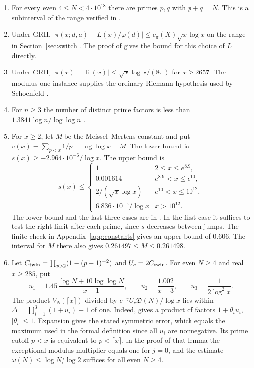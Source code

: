 \documentclass[11pt]{article}
\theoremstyle{remark}\newtheorem{remark}[theorem]{Remark}
\begin{document}
\begin{enumerate}[label=\textnormal{(\roman*)},leftmargin=*,itemsep=4pt]
\item For every even $4\le N<4\cdot10^{18}$ there are primes $p,q$ with $p+q=N$. This is a subinterval of the range verified in \cite{OHP}.
\item Under GRH, $|\pi(x;d,a)-L(x)/\varphi(d)|\le c_\pi(X)\sqrt x\log x$ on the range in Section~\ref{sec:switch}. The proof of \cite[Lemma~5.1]{JS} gives the bound for this choice of $L$ directly.
\item Under GRH, $|\pi(x)-\operatorname{li}(x)|\le\sqrt{x}\log x/(8\pi)$ for $x\ge2657$. The modulus-one instance supplies the ordinary Riemann hypothesis used by Schoenfeld \cite[Corollary~1]{Schoenfeld}.
\item For $n\ge3$ the number of distinct prime factors is less than $1.3841\log n/\log\log n$ \cite[Théorème 11]{Robin}.
\item For $x\ge2$, let $M$ be the Meissel--Mertens constant and put $s(x)=\sum_{p<x}1/p-\log\log x-M$. The lower bound is $s(x)\ge-2.964\cdot10^{-6}/\log x$. The upper bound is
\[
 s(x)\le\begin{cases}
 1 & 2\le x\le e^{8.9},\\
 0.001614 & e^{8.9}<x\le e^{10},\\
 2/(\sqrt x\log x) & e^{10}<x\le10^{12},\\
 6.836\cdot10^{-6}/\log x & x>10^{12}.
 \end{cases}
\]
The lower bound and the last three cases are in \cite[Lemma~3.2 and its proof]{JS}. In the first case it suffices to test the right limit after each prime, since $s$ decreases between jumps. The finite check in Appendix~\ref{app:constants} gives an upper bound of $0.606$. The interval for $M$ there also gives $0.261497\le M\le0.261498$.
\item Let $C_{\rm twin}=\prod_{p>2}(1-(p-1)^{-2})$ and $U_c=2C_{\rm twin}$. For even $N\ge4$ and real $x\ge285$, put
\[
 u_1=1.45\,\frac{\log N+10\log\log N}{x-1},\qquad
 u_2=\frac{1.002}{x-3},\qquad u_3=\frac1{2\log^2 x}.
\]
The product $V_N(\lceil x\rceil)$ divided by $e^{-\gamma}U_c\mathfrak D(N)/\log x$ lies within
$\Delta=\prod_{i=1}^3(1+u_i)-1$ of one. Indeed, \cite[Lemma~38, $j=0$]{BJS} gives a product of factors $1+\theta_i u_i$, $|\theta_i|\le1$. Expansion gives the stated symmetric error, which equals the maximum used in the formal definition since all $u_i$ are nonnegative. Its prime cutoff $p<x$ is equivalent to $p<\lceil x\rceil$. In the proof of that lemma the exceptional-modulus multiplier equals one for $j=0$, and the estimate $\omega(N)\le\log N/\log 2$ suffices for all even $N\ge4$.
\end{enumerate}
\end{document}
